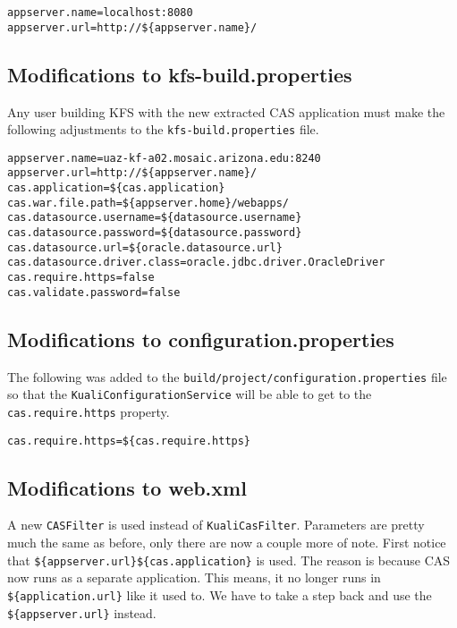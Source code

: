 \documentclass[12pt,notitlepage]{article}
\begin{document}
\begin{lstlisting}
appserver.name=localhost:8080
appserver.url=http://${appserver.name}/
\end{lstlisting}

\subsection{Modifications to kfs-build.properties}
Any user building KFS with the new extracted CAS application must make the following adjustments
to the \verb|kfs-build.properties| file.

\begin{lstlisting}[caption=kfs-build.properties]
appserver.name=uaz-kf-a02.mosaic.arizona.edu:8240
appserver.url=http://${appserver.name}/
cas.application=${cas.application}
cas.war.file.path=${appserver.home}/webapps/
cas.datasource.username=${datasource.username}
cas.datasource.password=${datasource.password}
cas.datasource.url=${oracle.datasource.url}
cas.datasource.driver.class=oracle.jdbc.driver.OracleDriver
cas.require.https=false
cas.validate.password=false
\end{lstlisting}

\subsection{Modifications to configuration.properties}
The following was added to the \verb|build/project/configuration.properties| file so that
the \verb|KualiConfigurationService| will be able to get to the \verb|cas.require.https| property.
\begin{lstlisting}
cas.require.https=${cas.require.https}
\end{lstlisting}

\subsection{Modifications to web.xml}
A new \verb|CASFilter| is used instead of \verb|KualiCasFilter|. Parameters are pretty 
much the same as before, only there are now a couple more of note. First notice that 
\verb|${appserver.url}${cas.application}| is used. The reason is because CAS now runs as 
a separate application. This means, it no longer runs in \verb|${application.url}| like it
used to. We have to take a step back and use the \verb|${appserver.url}| instead.
\end{document}

